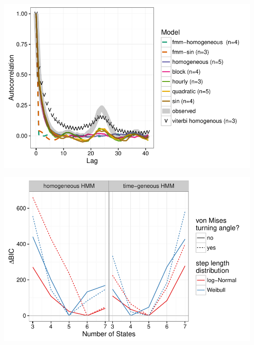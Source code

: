 \documentclass{article}\usepackage[]{graphicx}\usepackage{xcolor}
\makeatletter
\def\maxwidth{ %
  \ifdim\Gin@nat@width>\linewidth
    \linewidth
  \else
    \Gin@nat@width
  \fi
}
\newenvironment{knitrout}{}{} %
\makeatother
\begin{document}
\clearpage

\begin{knitrout}
\color{fgcolor}
\includegraphics[width=\maxwidth]{figure/acf_plot14-1} 

\end{knitrout}

\clearpage

\begin{knitrout}
\color{fgcolor}
\includegraphics[width=\maxwidth]{figure/BICred_plot15-1} 

\end{knitrout}


\clearpage
\end{document}

